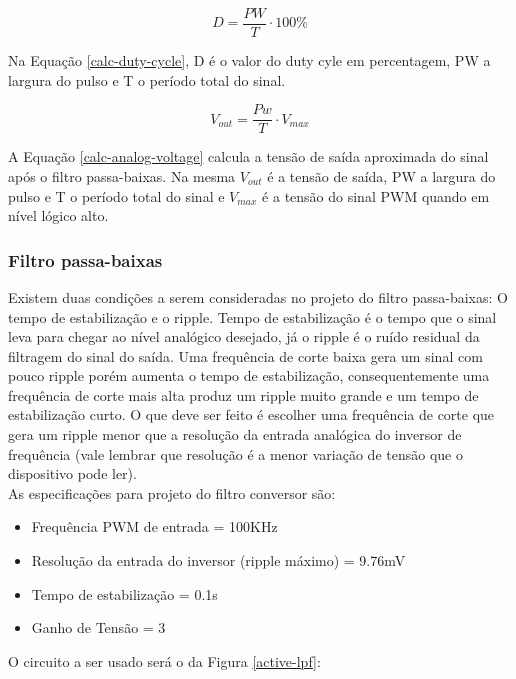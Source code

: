 \begin{equation}\label{calc-duty-cycle}
	D=\frac{ PW }{ T } \cdot 100 \%
\end{equation}

Na Equação \ref{calc-duty-cycle}, D é o valor do duty cyle em percentagem, PW a largura do pulso e T o período total do sinal.

\begin{equation}\label{calc-analog-voltage}
	V_{out}=\frac{ Pw }{ T } \cdot V_{max}
\end{equation}

A Equação \ref{calc-analog-voltage} calcula a tensão de saída aproximada do sinal após o filtro passa-baixas. Na mesma $V_{out}$ é a tensão de saída, PW a largura do pulso e T o período total do sinal e $V_{max}$ é a tensão do sinal PWM quando em nível lógico alto.

\subsubsection{Filtro passa-baixas}

Existem duas condições a serem consideradas no projeto do filtro passa-baixas: O tempo de estabilização e o ripple. Tempo de estabilização é o tempo que o sinal leva para chegar ao nível analógico desejado, já o ripple é o ruído residual da filtragem do sinal do saída. Uma frequência de corte baixa gera um sinal com pouco ripple porém aumenta o tempo de estabilização, consequentemente uma frequência de corte mais alta produz um ripple muito grande e um tempo de estabilização curto. O que deve ser feito é escolher uma frequência de corte que gera um ripple menor que a resolução da entrada analógica do inversor de frequência (vale lembrar que resolução é a menor variação de tensão que o dispositivo pode ler). \\

As especificações para projeto do filtro conversor são:

\begin{itemize}
	\item Frequência PWM de entrada = 100KHz
	\item Resolução da entrada do inversor (ripple máximo) = 9.76mV
	\item Tempo de estabilização = 0.1s
	\item Ganho de Tensão = 3 
\end{itemize}

O circuito a ser usado será o da Figura \ref{active-lpf}:

